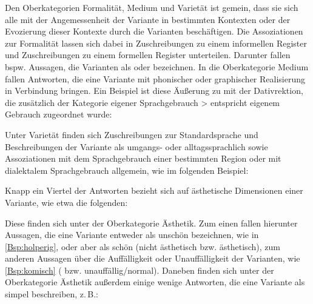 Den Oberkategorien \glqq Formalität\grqq, \glqq Medium\grqq{} und \glqq Varietät\grqq{} ist gemein, dass sie sich alle mit der Angemessenheit der Variante in bestimmten Kontexten oder der Evozierung dieser Kontexte durch die Varianten beschäftigen. 
Die Assoziationen zur Formalität lassen sich dabei in Zuschreibungen zu einem informellen Register und Zuschreibungen zu einem formellen Register unterteilen. 
Darunter fallen bspw. Aussagen, die Varianten als  oder  bezeichnen. 
In die Oberkategorie \glqq Medium\grqq{} fallen Antworten, die eine Variante mit phonischer oder graphischer Realisierung in Verbindung bringen. Ein Beispiel ist diese Äußerung zu \dank{} mit der Dativrektion, die zusätzlich der Kategorie \glqq eigener Sprachgebrauch > entspricht eigenem Gebrauch\grqq{} zugeordnet wurde: 
\begin{exe}
\ex {}
\end{exe}
Unter \glqq Varietät\grqq{} finden sich Zuschreibungen zur Standardsprache und Beschreibungen der Variante als umgangs- oder alltagssprachlich sowie Assoziationen mit dem Sprachgebrauch einer bestimmten Region oder mit dialektalem Sprachgebrauch allgemein, wie im folgenden Beispiel:
\begin{exe}
\ex {}
\end{exe}
Knapp ein Viertel der Antworten bezieht sich auf ästhetische Dimensionen einer Variante, wie etwa die folgenden: 
\begin{exe}
\ex {} \label{Bsp:holperig}
\ex {} \label{Bsp:komisch}
\end{exe}
Diese finden sich unter der Oberkategorie \glqq Ästhetik\grqq. 
Zum einen fallen hierunter Aussagen, die eine Variante entweder als unschön bezeichnen, wie in \autoref{Bsp:holperig}, oder aber als schön (\glqq nicht ästhetisch\grqq{} bzw. \glqq ästhetisch\grqq), zum anderen Aussagen über die Auffälligkeit oder Unauffälligkeit der Varianten, wie \autoref{Bsp:komisch} (\grqq{} bzw. \glqq unauffällig/normal\grqq). 
Daneben finden sich unter der Oberkategorie \glqq Ästhetik\grqq{} außerdem einige wenige Antworten, die eine Variante als \glqq simpel\grqq{} beschreiben, z.\,B.:
\begin{exe}
\ex {} 
\end{exe}


